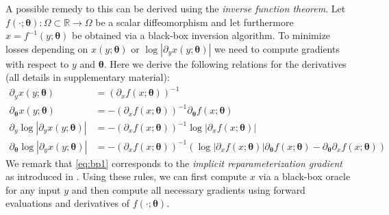 \documentclass{article}
\begin{document}
A possible remedy to this can be derived using the \textit{inverse function theorem}. Let $f(\cdot; \bm\theta) \colon \Omega \subset \mathbb{R} \rightarrow \Omega$ be a scalar diffeomorphism and let furthermore $ x = f^{-1}(y; \bm\theta)$ be obtained via a black-box inversion algorithm. To minimize losses depending on $x(y; \bm \theta)$ or $\log |\partial_{y} x(y; \bm \theta)|$ we need to compute gradients with respect to $y$ and $\bm \theta$. Here we derive the following relations for the derivatives (all details in supplementary material):
\begin{align}
    \partial_{y} x(y; \bm \theta) &= \left( \partial_{x} f( x; \bm \theta) \right)^{-1} \label{eq:bp1}\\
    \partial_{\bm \theta} x(y; \bm \theta) &= -\left(\partial_{x} f( x; \bm \theta)\right)^{-1} \partial_{\bm\theta} f( x; \bm \theta)\\
    \partial_{y} \log \left| \partial_{y} x(y; \bm \theta) \right| &= -\left(\partial_{x} f( x; \bm \theta)\right)^{-1} \log \left| \partial_{x} f( x; \bm \theta) \right|\\
    \partial_{\bm \theta} \log \left| \partial_{y} x(y; \bm \theta) \right| &= -\left(\partial_{x} f( x; \bm \theta)\right)^{-1} \left( \log \left| \partial_{x} f( x; \bm \theta) \right| \partial_{\bm \theta} f( x; \bm \theta) - \partial_{\bm \theta}\partial_{x} f( x; \bm \theta) \right) \label{eq:bp4}
\end{align}
We remark that \eqref{eq:bp1} corresponds to the \emph{implicit reparameterization gradient} as introduced in \citet{figurnov2018implicit}. Using these rules, we can first compute $x$ via a black-box oracle for any input $y$ and then compute all necessary gradients using forward evaluations and derivatives of $f(\cdot; \bm\theta)$. 
\end{document}
